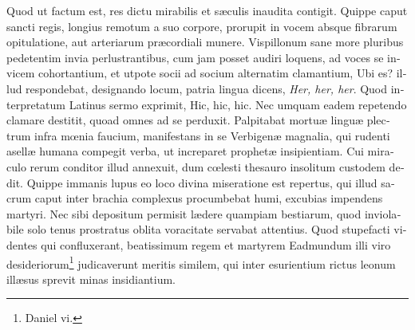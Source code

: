 \documentclass[10pt]{book}
\begin{document}
\begin{paracol}{2}
\begin{otherlanguage}{latin}
Quod ut factum est, res dictu mirabilis et s\ae{}culis inaudita contigit. Quippe caput sancti regis, longius remotum a suo corpore, prorupit in vocem absque fibrarum opitulatione, aut arteriarum pr\ae{}cordiali munere. Vispillonum sane more pluribus pedetentim invia perlustrantibus, cum jam posset audiri loquens, ad voces se invicem cohortantium, et utpote socii ad socium alternatim clamantium, Ubi es? illud respondebat, designando locum, patria lingua dicens, \emph{Her, her, her}. Quod interpretatum Latinus sermo exprimit, Hic, hic, hic. Nec umquam eadem repetendo clamare destitit, quoad omnes ad se perduxit. Palpitabat mortu\ae{} lingu\ae{} plectrum infra m\oe{}nia faucium, manifestans in se Verbigen\ae{} magnalia, qui rudenti asell\ae{} humana compegit verba, ut increparet prophet\ae{} insipientiam. Cui miraculo rerum conditor illud annexuit, dum c\oe{}lesti thesauro insolitum custodem dedit. Quippe immanis lupus eo loco divina miseratione est repertus, qui illud sacrum caput inter brachia complexus procumbebat humi, excubias impendens martyri. Nec sibi depositum permisit l\ae{}dere quampiam bestiarum, quod inviolabile solo tenus prostratus oblita voracitate servabat attentius. Quod stupefacti videntes qui confluxerant, beatissimum regem et martyrem Eadmundum illi viro desideriorum\footnote[1]{Daniel vi.} judicaverunt meritis similem, qui inter esurientium rictus leonum ill\ae{}sus sprevit minas insidiantium.
\end{otherlanguage}

\switchcolumn


\end{paracol}
\end{document}
